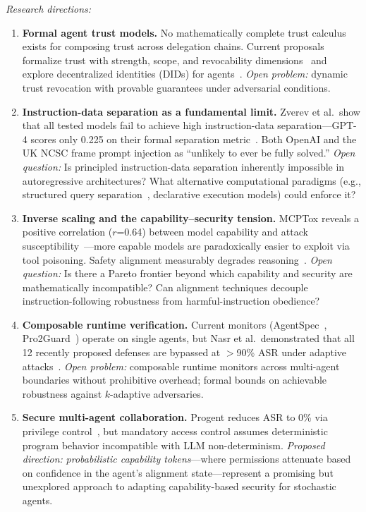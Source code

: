 \emph{Research directions:}
\begin{enumerate}[nosep,leftmargin=1.5em]
    \item \textbf{Formal agent trust models.} No mathematically complete trust calculus exists for composing trust across delegation chains. Current proposals formalize trust with strength, scope, and revocability dimensions~\cite{trustparadox2025} and explore decentralized identities (DIDs) for agents~\cite{rodriguez2025did}. \emph{Open problem:} dynamic trust revocation with provable guarantees under adversarial conditions.
    \item \textbf{Instruction-data separation as a fundamental limit.} Zverev et al.\ show that all tested models fail to achieve high instruction-data separation---GPT-4 scores only 0.225 on their formal separation metric~\cite{zverev2025separation}. Both OpenAI and the UK NCSC frame prompt injection as ``unlikely to ever be fully solved.'' \emph{Open question:} Is principled instruction-data separation inherently impossible in autoregressive architectures? What alternative computational paradigms (e.g., structured query separation~\cite{chen2025struq}, declarative execution models) could enforce it?
    \item \textbf{Inverse scaling and the capability--security tension.} MCPTox reveals a positive correlation ($r$=0.64) between model capability and attack susceptibility~\cite{wang2025mcptox}---more capable models are paradoxically easier to exploit via tool poisoning. Safety alignment measurably degrades reasoning~\cite{huang2025safetytax}. \emph{Open question:} Is there a Pareto frontier beyond which capability and security are mathematically incompatible? Can alignment techniques decouple instruction-following robustness from harmful-instruction obedience?
    \item \textbf{Composable runtime verification.} Current monitors (AgentSpec~\cite{wang2025agentspec}, Pro2Guard~\cite{pro2guard2025}) operate on single agents, but Nasr et al.\ demonstrated that all 12 recently proposed defenses are bypassed at $>$90\% ASR under adaptive attacks~\cite{nasr2025attacker}. \emph{Open problem:} composable runtime monitors across multi-agent boundaries without prohibitive overhead; formal bounds on achievable robustness against $k$-adaptive adversaries.
    \item \textbf{Secure multi-agent collaboration.} Progent reduces ASR to 0\% via privilege control~\cite{shi2025progent}, but mandatory access control assumes deterministic program behavior incompatible with LLM non-determinism. \emph{Proposed direction:} \emph{probabilistic capability tokens}---where permissions attenuate based on confidence in the agent's alignment state---represent a promising but unexplored approach to adapting capability-based security for stochastic agents.
\end{enumerate}


